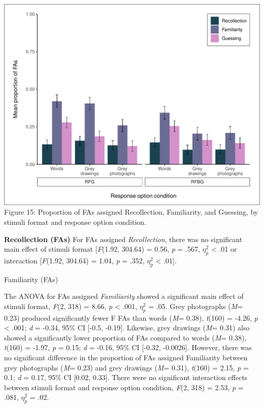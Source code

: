 \documentclass[
  11pt,
]{article}
\begin{document}
\includegraphics{R--Thesis_files/figure-latex/unnamed-chunk-40-1.pdf}
Figure 15: Proportion of FAs assigned Recollection, Familiarity, and
Guessing, by stimuli format and response option condition.

\textbf{Recollection (FAs)} For FAs assigned \emph{Recollection}, there
was no significant main effect of stimuli format {[}\emph{F}(1.92,
304.64) = 0.56, \emph{p} = .567, \(\eta^2_p\) \textless{} .01 or
interaction {[}\emph{F}(1.92, 304.64) = 1.04, \emph{p} = .352,
\(\eta^2_p\) \textless{} .01{]}.

Familiarity (FAs)

The ANOVA for FAs assigned \emph{Familiarity} showed a significant main
effect of stimuli format, \emph{F}(2, 318) = 8.66, \emph{p} \textless{}
.001, \(\eta^2_p\) = .05. Grey photographs (\emph{M}= 0.23) produced
significantly fewer F FAs than words (\emph{M}= 0.38), \emph{t}(160) =
-4.26, \emph{p} \textless{} .001; \emph{d} = -0.34, 95\% CI {[}-0.5,
-0.19{]}. Likewise, grey drawings (\emph{M}= 0.31) also showed a
significantly lower proportion of FAs compared to words (\emph{M}=
0.38), \emph{t}(160) = -1.97, \emph{p} = 0.15; \emph{d} = -0.16, 95\% CI
{[}-0.32, -0.0026{]}. However, there was no significant difference in
the proportion of FAs assigned Familiarity between grey photographs
(\emph{M}= 0.23) and grey drawings (\emph{M}= 0.31), \emph{t}(160) =
2.15, \emph{p} = 0.1; \emph{d} = 0.17, 95\% CI {[}0.02, 0.33{]}. There
were no significant interaction effects between stimuli format and
response option condition, \emph{F}(2, 318) = 2.53, \emph{p} = .081,
\(\eta^2_p\) = .02.
\end{document}
